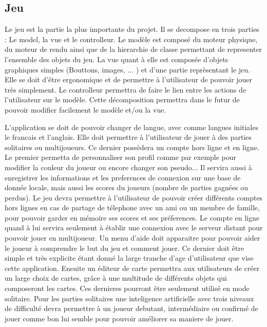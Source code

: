 \documentclass[a4paper,11pt]{report}
\begin{document}
		\subsection{Jeu}
		
		Le jeu est la partie la plus importante du projet. 
		Il se decompose en trois parties : Le model, la vue et le controlleur. 
		Le modèle est composé du moteur physique, du moteur de rendu ainsi que de la
		hierarchie de classe permettant de representer l'ensemble des objets du jeu. 
		La vue quant à elle est composée d'objets graphiques simples (Bouttons, images, ... ) 
		et d'une partie reprèsentant le jeu. Elle se doit d'être ergonomique et de permettre
		à l'utilisateur de pouvoir jouer très simplement. Le controlleur permettra de faire 
		le lien entre les actions de l'utilisateur sur le modèle. Cette décomposition permettra dans 
		le futur de pouvoir modifier facilement le modèle et/ou la vue.
		
		L'application se doit de pouvoir changer de langue, avec comme langues initiales le francais et l'anglais.
		Elle doit permettre à l'utilisateur de jouer à des parties solitaires ou multijoueurs. 
		Ce dernier possèdera un compte hors ligne et en ligne.		
		Le premier permetta de personnaliser son profil comme par exemple pour modifier
		la couleur du joueur ou encore changer son pseudo... Il servira aussi à enregistrer les informations
		et les preferences de connexion sur une base de donnée locale,
		mais aussi les scores du joueurs (nombre de parties gagnées ou perdus). 
		Le jeu devra permettre à l'utilisateur de pouvoir créer différents comptes hors lignes en cas de partage de télephone
		avec un ami ou un membre de famille, pour pouvoir garder en mémoire ses scores et ses préferences.		
		Le compte en ligne quand à lui servira seulement à établir une connexion avec le serveur distant pour pouvoir jouer en multijoueur.		
		Un menu d'aide doit apparaitre pour pouvoir aider le joueur à comprendre le but du jeu et comment jouer. 
		Ce dernier doit être simple et très explicite étant donné la large tranche d'age d'utilisateur que vise cette application.		
		Ensuite un éditeur de carte permettra aux utilisateurs de créer un large choix de cartes, 
		grâce à une multitude de différents objets qui composeront les cartes. Ces dernieres pourront être seulement utilisé en mode solitaire.
		Pour les parties solitaires une inteligence artificielle avec trois niveaux de difficulté 
		devra permettre à un joueur debutant, intermédiaire ou confirmé de jouer comme bon lui semble pour pouvoir améliorer sa maniere de jouer.
		
\end{document}
